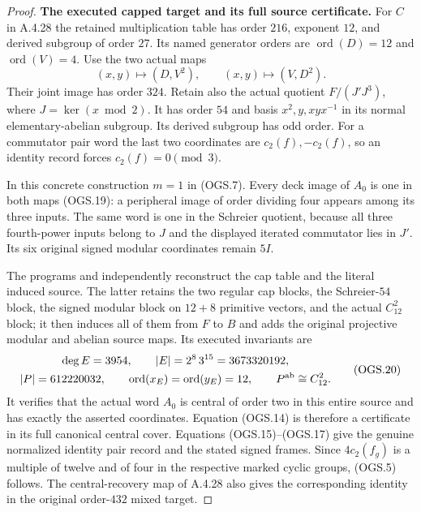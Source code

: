 \begin{proof}
\par\medskip\noindent\textbf{The executed capped target and its full source certificate.}\quad
For $C$ in A.4.28 the retained multiplication table
has order $216$, exponent $12$, and derived subgroup
of order $27$.
Its named generator orders are
$\operatorname{ord}(D)=12$ and $\operatorname{ord}(V)=4$.
Use the two actual maps
\[
     (x,y)\mapsto(D,V^2),\qquad (x,y)\mapsto(V,D^2).
                                                               \tag{OGS.19}
\]
Their joint image has order $324$.
Retain also the actual quotient
$F/(J'J^3)$, where $J=\ker(x\bmod2)$.
It has order $54$ and basis $x^2,y,xyx^{-1}$ in
its normal elementary-abelian subgroup.
Its derived subgroup has odd order.
For a commutator pair word the last two coordinates
are $c_2(f),-c_2(f)$, so an identity record forces
$c_2(f)=0\pmod3$.

In this concrete construction $m=1$ in (OGS.7).
Every deck image of $A_0$ is one in both maps
(OGS.19): a peripheral image of order dividing
four appears among its three inputs.
The same word is one in the Schreier quotient,
because all three fourth-power inputs belong to
$J$ and the displayed iterated commutator lies
in $J'$.
Its six original signed modular coordinates
remain $5I$.

The programs
 and
independently reconstruct the cap table and the
literal induced source.
The latter retains the two regular cap blocks,
the Schreier-$54$ block, the signed modular block
on $12+8$ primitive vectors, and the actual
$C_{12}^2$ block; it then induces all of them
from $F$ to $B$ and adds the original projective
modular and abelian source maps.
Its executed invariants are
\[
\begin{gathered}
 \deg E=3954,\qquad |E|=2^8\,3^{15}=3673320192,\\
 |P|=612220032,\qquad
 \operatorname{ord}(x_E)=\operatorname{ord}(y_E)=12,\qquad
 P^{\rm ab}\cong C_{12}^2 .
\end{gathered}                                                   \tag{OGS.20}
\]
It verifies that the actual word $A_0$ is central
of order two in this entire source and has exactly
the asserted coordinates.
Equation (OGS.14) is therefore a certificate in
its full canonical central cover.
Equations (OGS.15)--(OGS.17) give the genuine
normalized identity pair record and the stated
signed frames.
Since $4c_2(f_g)$ is a multiple of twelve and
of four in the respective marked cyclic groups,
(OGS.5) follows.
The central-recovery map of A.4.28 also gives
the corresponding identity in the original
order-$432$ mixed target.


\end{proof}
